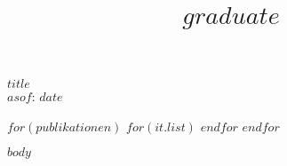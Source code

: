 \documentclass[a4paper,%
            11pt] %
            {moderncv} %
\title{$graduate$}
\begin{document}
\makecvtitle
\begin{center}
\Huge \textbf{$title$}\normalsize\\[2mm] $asof$: $date$
\end{center}
\bigskip
\nocite{*}

$for(publikationen)$
$for(it.list)$
\printbibliography[keyword={$it.key$}, title={$it.title$}$if(subbibliography)$, heading=subbibliography$endif$]
$endfor$
$endfor$

$body$
\end{document}
